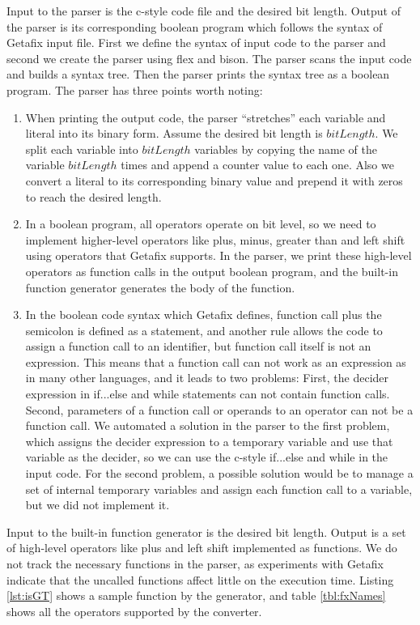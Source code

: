 Input to the parser is the c-style code file and the desired bit length. Output of the parser is its corresponding boolean program which follows the syntax of Getafix input file. First we define the syntax of input code to the parser and second we create the parser using flex and bison. The parser scans the input code and builds a syntax tree. Then the parser prints the syntax tree as a boolean program. The parser has three points worth noting:

\begin{enumerate}
\item When printing the output code, the parser ``stretches'' each variable and literal into its binary form. Assume the desired bit length is $bitLength$. We split each variable into $bitLength$ variables by copying the name of the variable $bitLength$ times and append a counter value to each one. Also we convert a literal to its corresponding binary value and prepend it with zeros to reach the desired length.
\item In a boolean program, all operators operate on bit level, so we need to implement higher-level operators like plus, minus, greater than and left shift using operators that Getafix supports. In the parser, we print these high-level operators as function calls in the output boolean program, and the built-in function generator generates the body of the function.
\item In the boolean code syntax which Getafix defines, function call plus the semicolon is defined as a statement, and another rule allows the code to assign a function call to an identifier, but function call itself is not an expression. This means that a function call can not work as an expression as in many other languages, and it leads to two problems: First, the decider expression in if...else and while statements can not contain function calls. Second, parameters of a function call or operands to an operator can not be a function call. We automated a solution in the parser to the first problem, which assigns the decider expression to a temporary variable and use that variable as the decider, so we can use the c-style if...else and while in the input code. For the second problem, a possible solution would be to manage a set of internal temporary variables and assign each function call to a variable, but we did not implement it.
\end{enumerate}

Input to the built-in function generator is the desired bit length. Output is a set of high-level operators like plus and left shift implemented as functions. We do not track the necessary functions in the parser, as experiments with Getafix indicate that the uncalled functions affect little on the execution time. Listing \ref{lst:isGT} shows a sample function by the generator, and table \ref{tbl:fxNames} shows all the operators supported by the converter.

